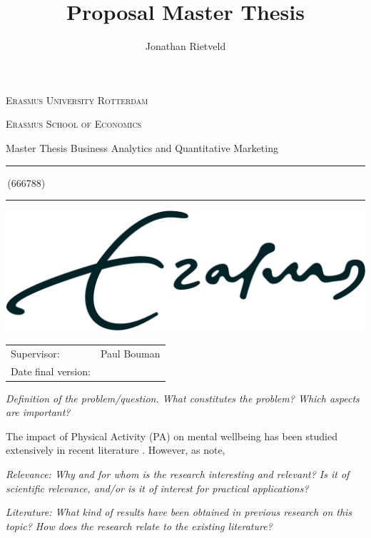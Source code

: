 \documentclass[a4paper,11pt]{report}
\author{Jonathan Rietveld}
\title{Proposal Master Thesis}
\newcommand{\studentnumber}{666788}
\newcommand{\program}{Business Analytics and Quantitative Marketing}
\newcommand{\supervisor}{Paul Bouman}
\begin{document}
\begin{titlepage}
\makeatletter
\begin{center}
	\textsc{Erasmus University Rotterdam}
	\par \textsc{Erasmus School of Economics}
	\par Master Thesis \program

	\vfill \hrule height .08em \bigskip
	\par\huge\@title\bigskip
	\par\Large\@author\,(\studentnumber)\bigskip
	\hrule height .08em\normalsize

	\vfill
	\includegraphics[width=\textwidth,height=0.15\textheight,keepaspectratio]{../eur}
	\vfill

	\begin{tabular}{ll}
		\toprule
		Supervisor: & \supervisor\\
		Date final version: & \@date\\
		\bottomrule
	\end{tabular}

	\vfill
\end{center}
\makeatother
\end{titlepage}

\textit{Definition of the problem/question. What constitutes the problem? Which aspects are important?}

The impact of Physical Activity (PA) on mental wellbeing has been studied extensively in recent literature \cite{smith2021role, noetel2024effect, mahindru2023role}.
However, as  note,

\textit{Relevance: Why and for whom is the research interesting and relevant? Is it of scientific relevance, and/or is it of interest for practical applications?}

\textit{Literature: What kind of results have been obtained in previous research on this topic? How does the research relate to the existing literature?}
\end{document}
